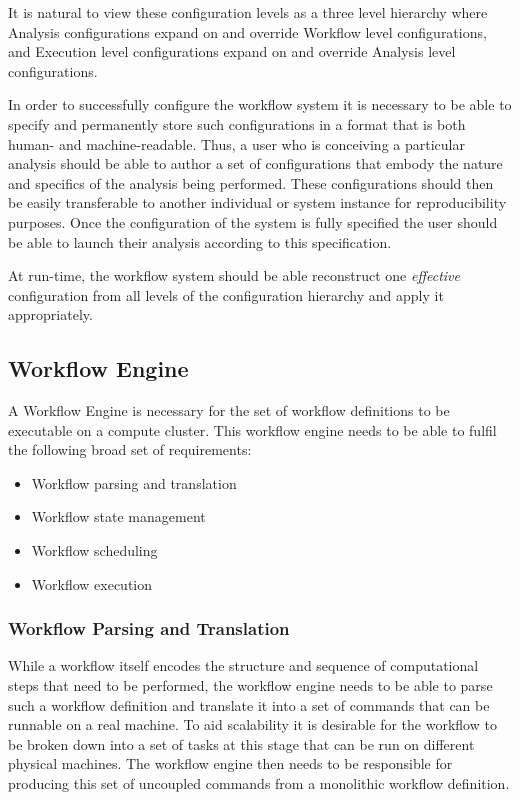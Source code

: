 It is natural to view these configuration levels as a three level hierarchy where Analysis configurations expand on and override Workflow level configurations, and Execution level configurations expand on and override Analysis level configurations.

In order to successfully configure the workflow system it is necessary to be able to specify and permanently store such configurations in a format that is both human- and machine-readable. Thus, a user who is conceiving a particular analysis should be able to author a set of configurations that embody the nature and specifics of the analysis being performed. These configurations should then be easily transferable to another individual or system instance for reproducibility purposes. Once the configuration of the system is fully specified the user should be able to launch their analysis according to this specification.

At run-time, the workflow system should be able reconstruct one \emph{effective} configuration from all levels of the configuration hierarchy and apply it appropriately.

\subsection {Workflow Engine} \label{sec:workflow_engine}

A Workflow Engine is necessary for the set of workflow definitions to be executable on a compute cluster. This workflow engine needs to be able to fulfil the following broad set of requirements:

\begin{itemize}
\item Workflow parsing and translation
\item Workflow state management
\item Workflow scheduling
\item Workflow execution
\end{itemize}

\subsubsection{Workflow Parsing and Translation}

While a workflow itself encodes the structure and sequence of computational steps that need to be performed, the workflow engine needs to be able to parse such a workflow definition and translate it into a set of commands that can be runnable on a real machine. To aid scalability it is desirable for the workflow to be broken down into a set of tasks at this stage that can be run on different physical machines. The workflow engine then needs to be responsible for producing this set of uncoupled commands from a monolithic workflow definition.

